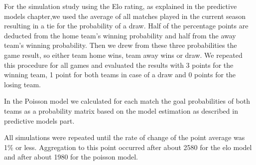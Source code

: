 \documentclass[12pt,a4paper]{article}
\begin{document}
For the simulation study using the Elo rating, as explained in the
predictive models chapter,we used the average of all matches played in
the current season resulting in a tie for the probability of a draw.
Half of the percentage points are deducted from the home team's winning
probability and half from the away team's winning probability. Then we
drew from these three probabilities the game result, so either team home
wins, team away wins or draw. We repeated this procedure for all games
and evaluated the results with 3 points for the winning team, 1 point
for both teams in case of a draw and 0 points for the losing team.

In the Poisson model we calculated for each match the goal probabilities
of both teams as a probability matrix based on the model estimation as
described in predictive models part.

All simulations were repeated until the rate of change of the point
average was 1\% or less. Aggregation to this point occurred after about
2580 for the elo model and after about 1980 for the poisson model.
\end{document}
